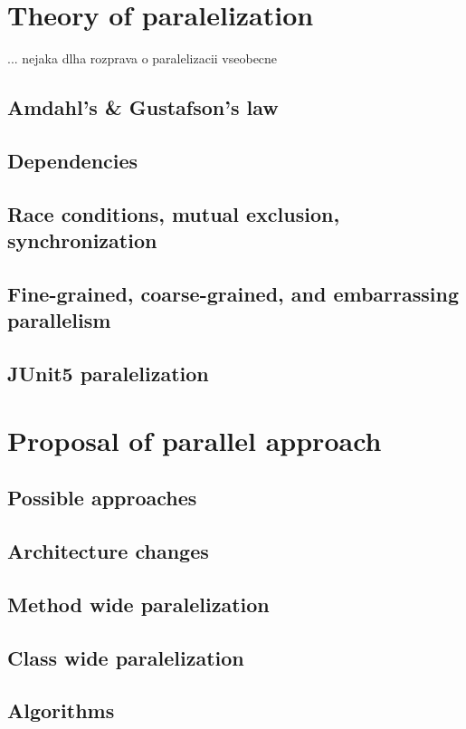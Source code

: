 \chapter{Theory of paralelization}

... nejaka dlha rozprava o paralelizacii vseobecne
\section{Amdahl's \& Gustafson's law}
\section{Dependencies}
\section{Race conditions, mutual exclusion, synchronization}
\section{Fine-grained, coarse-grained, and embarrassing parallelism}
\section{JUnit5 paralelization}

\chapter{Proposal of parallel approach}

\section{Possible approaches}
\section{Architecture changes} %
\section{Method wide paralelization}
\section{Class wide paralelization}
\section{Algorithms} 

